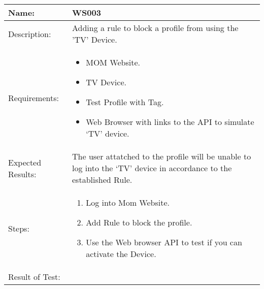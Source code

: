 \begin{table}[h]
	\centering
		\begin{tabular*}{\textwidth}{|l|l|}
		\hline
		\hline
		Name: & WS003\\
		\hline
		Description: & \parbox{0.70\textwidth}{Adding a rule to block a profile from using the 'TV' Device.}\\
		\hline
		Requirements: & \parbox{0.70\textwidth}{
		\begin{itemize}
			\item MOM Website.
			\item TV Device.
			\item Test Profile with Tag.
			\item Web Browser with links to the API to simulate `TV' device.
		\end{itemize}}
		\\
		\hline
		Expected Results: & \parbox{.70\textwidth}{The user attatched to the profile will be unable to log into the `TV' device in accordance to the established Rule.}\\
		\hline
		Steps: & \parbox{.70\textwidth}{
		\begin{enumerate}
			\item Log into Mom Website.
			\item Add Rule to block the profile.
			\item Use the Web browser API to test if you can activate the Device.
		\end{enumerate}}
		\\		
		\hline
		Result of Test: & \\
		\hline
		\end{tabular*}
\end{table}